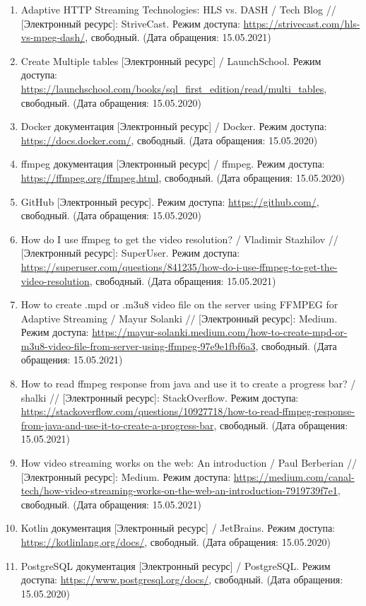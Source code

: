 \documentclass{../includes/TechDoc}
\begin{document}
\begin{enumerate}
        \item Adaptive HTTP Streaming Technologies: HLS vs. DASH / Tech Blog // [Электронный ресурс]: StriveCast. Режим доступа: \url{https://strivecast.com/hls-vs-mpeg-dash/}, свободный. (Дата обращения: 15.05.2021)
        \item Create Multiple tables [Электронный ресурс] / LaunchSchool. Режим доступа: \url{https://launchschool.com/books/sql_first_edition/read/multi_tables}, свободный. (Дата обращения: 15.05.2020)
        \item Docker документация [Электронный ресурс] / Docker. Режим доступа: \url{https://docs.docker.com/}, свободный. (Дата обращения: 15.05.2020)
        \item ffmpeg документация [Электронный ресурс] / ffmpeg. Режим доступа: \url{https://ffmpeg.org/ffmpeg.html}, свободный. (Дата обращения: 15.05.2020)
        \item GitHub [Электронный ресурс]. Режим доступа: \url{https://github.com/}, свободный. (Дата обращения: 15.05.2020)
        \item How do I use ffmpeg to get the video resolution? / Vladimir Stazhilov // [Электронный ресурс]: SuperUser. Режим доступа: \url{https://superuser.com/questions/841235/how-do-i-use-ffmpeg-to-get-the-video-resolution}, свободный. (Дата обращения: 15.05.2021)
        \item How to create .mpd or .m3u8 video file on the server using FFMPEG for Adaptive Streaming / Mayur Solanki // [Электронный ресурс]: Medium. Режим доступа: \url{https://mayur-solanki.medium.com/how-to-create-mpd-or-m3u8-video-file-from-server-using-ffmpeg-97e9e1fbf6a3}, свободный. (Дата обращения: 15.05.2021)
        \item How to read ffmpeg response from java and use it to create a progress bar? / shalki // [Электронный ресурс]: StackOverflow. Режим доступа: \url{https://stackoverflow.com/questions/10927718/how-to-read-ffmpeg-response-from-java-and-use-it-to-create-a-progress-bar}, свободный. (Дата обращения: 15.05.2021)
        \item How video streaming works on the web: An introduction / Paul Berberian // [Электронный ресурс]: Medium. Режим доступа: \url{https://medium.com/canal-tech/how-video-streaming-works-on-the-web-an-introduction-7919739f7e1}, свободный. (Дата обращения: 15.05.2021)
        \item Kotlin документация [Электронный ресурс] / JetBrains. Режим доступа: \url{https://kotlinlang.org/docs/}, свободный. (Дата обращения: 15.05.2020)
        \item PostgreSQL документация [Электронный ресурс] / PostgreSQL. Режим доступа: \url{https://www.postgresql.org/docs/}, свободный. (Дата обращения: 15.05.2020)

\end{enumerate}
\end{document}
